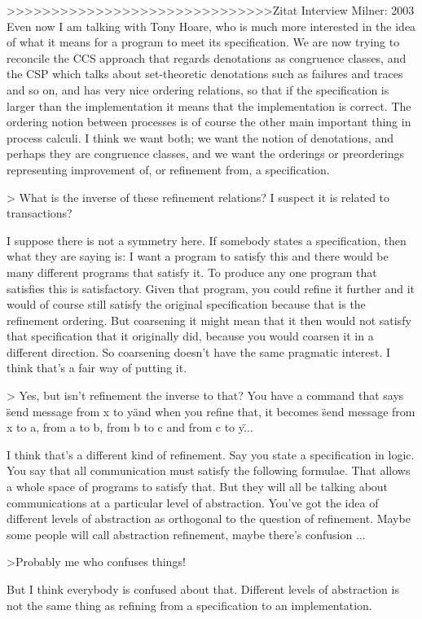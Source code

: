 \begin{old}
>>>>>>>>>>>>>>>>>>>>>>>>>>>>>>Zitat Interview Milner: 2003
Even now I am talking with Tony Hoare, who is much more interested in the idea of what it means for a program to meet its specification. We are now trying to reconcile the CCS approach that regards denotations as congruence classes, and the CSP which talks about set-theoretic denotations such as failures and traces and so on, and has very nice ordering relations, so that if the specification is larger than the implementation it means that the implementation is correct. The ordering notion between processes is of course the other main important thing in process calculi. I think we want both; we want the notion of denotations, and perhaps they are congruence classes, and we want the orderings or preorderings representing improvement of, or refinement from, a specification.

> What is the inverse of these refinement relations? I suspect it is related to transactions?

I suppose there is not a symmetry here. If somebody states a specification, then what they are saying is: I want a program to satisfy this and there would be many different programs that satisfy it. To produce any one program that satisfies this is satisfactory. Given that program, you could refine it further and it would of course still satisfy the original specification because that is the refinement ordering. But coarsening it might mean that it then would not satisfy that specification that it originally did, because you would coarsen it in a different direction. So coarsening doesn't have the same pragmatic interest. I think that's a fair way of putting it.


> Yes, but isn't refinement the inverse to that? You have a command that says \"send message from x to y\" and when you refine that, it becomes \"send message from x to a, from a to b, from b to c and from c to y\" ...

I think that's a different kind of refinement. Say you state a specification in logic. You say that all communication must satisfy the following formulae. That allows a whole space of programs to satisfy that. But they will all be talking about communications at a particular level of abstraction. You've got the idea of different levels of abstraction as orthogonal to the question of refinement. Maybe some people will call abstraction refinement, maybe there's confusion ...

>Probably me who confuses things!

But I think everybody is confused about that. Different levels of abstraction is not the same thing as refining from a specification to an implementation. 
\end{old}
